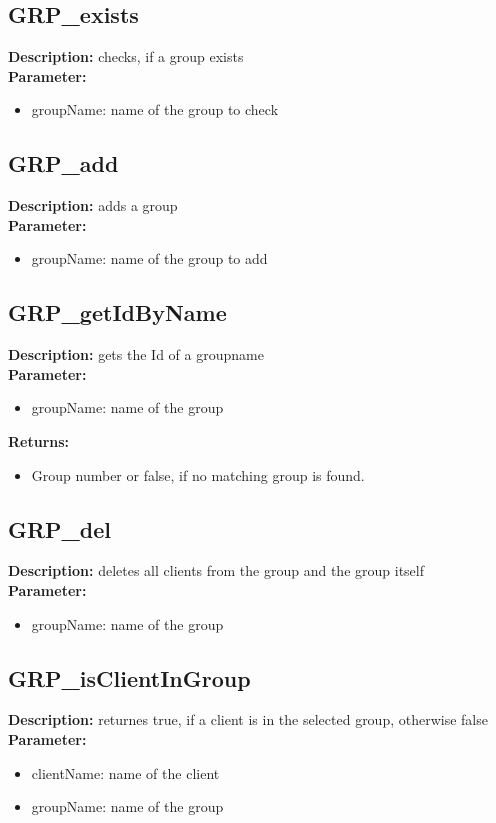 \subsection{GRP\_exists}
\textbf{Description:} checks, if a group exists\\
\textbf{Parameter:}
\begin{itemize}
\item groupName: name of the group to check
\end{itemize}

\subsection{GRP\_add}
\textbf{Description:} adds a group\\
\textbf{Parameter:}
\begin{itemize}
\item groupName: name of the group to add
\end{itemize}

\subsection{GRP\_getIdByName}
\textbf{Description:} gets the Id of a groupname\\
\textbf{Parameter:}
\begin{itemize}
\item groupName: name of the group
\end{itemize}
\textbf{Returns:}
\begin{itemize}
\item Group number or false, if no matching group is found.
\end{itemize}

\subsection{GRP\_del}
\textbf{Description:} deletes all clients from the group and the group itself\\
\textbf{Parameter:}
\begin{itemize}
\item groupName: name of the group
\end{itemize}

\subsection{GRP\_isClientInGroup}
\textbf{Description:} returnes true, if a client is in the selected group, otherwise false\\
\textbf{Parameter:}
\begin{itemize}
\item clientName: name of the client 
\item groupName: name of the group
\end{itemize}

